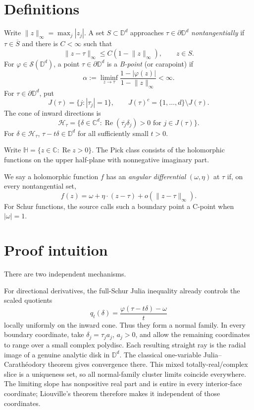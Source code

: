 \documentclass[11pt]{article}
\theoremstyle{definition}
\theoremstyle{remark}
\newcommand{\D}{\mathbb D}
\newcommand{\C}{\mathbb C}
\newcommand{\norm}[1]{\lVert #1\rVert_\infty}
\newcommand{\Schur}{\mathcal S}
\newcommand{\re}{\operatorname{Re}}
\begin{document}
\section{Definitions}

Write \(\norm{z}=\max_j|z_j|\).  A set \(S\subset\D^d\) approaches \(\tau\in\partial\D^d\) \emph{nontangentially} if \(\tau\in\overline S\) and there is \(C<\infty\) such that
\[
 \norm{z-\tau}\le C(1-\norm z),\qquad z\in S.
\]
For \(\varphi\in\Schur(\D^d)\), a point \(\tau\in\partial\D^d\) is a \emph{B-point} (or carapoint) if
\[
 \alpha:=\liminf_{z\to\tau}\frac{1-|\varphi(z)|}{1-\norm z}<\infty.
\]
For \(\tau\in\partial\D^d\), put
\[
 J(\tau)=\{j:|\tau_j|=1\},\qquad J(\tau)^c=\{1,\ldots,d\}\setminus J(\tau).
\]
The cone of inward directions is
\[
 \mathcal H_\tau
 =\{\delta\in\C^d:\re(\overline{\tau_j}\delta_j)>0\text{ for }j\in J(\tau)\}.
\]
For \(\delta\in\mathcal H_\tau\), \(\tau-t\delta\in\D^d\) for all sufficiently small \(t>0\).

Write \(\mathbb H=\{z\in\C:\re z>0\}\).  The Pick class consists of the holomorphic functions on the upper half-plane with nonnegative imaginary part.

We say a holomorphic function \(f\) has an \emph{angular differential} \((\omega,\eta)\) at \(\tau\) if, on every nontangential set,
\[
 f(z)=\omega+\eta\mathbin{\cdot}(z-\tau)+o(\norm{z-\tau}).
\]
For Schur functions, the source calls such a boundary point a C-point when \(|\omega|=1\).

\section{Proof intuition}

There are two independent mechanisms.

For directional derivatives, the full-Schur Julia inequality already controls the scaled quotients
\[
 q_t(\delta)=\frac{\varphi(\tau-t\delta)-\omega}{t}
\]
locally uniformly on the inward cone.  Thus they form a normal family.  In every boundary coordinate, take \(\delta_j=\tau_j a_j\), \(a_j>0\), and allow the remaining coordinates to range over a small complex polydisc.  Each resulting straight ray is the radial image of a genuine analytic disk in \(\D^d\).  The classical one-variable Julia--Carath\'eodory theorem gives convergence there.  This mixed totally-real/complex slice is a uniqueness set, so all normal-family cluster limits coincide everywhere.  The limiting slope has nonpositive real part and is entire in every interior-face coordinate; Liouville's theorem therefore makes it independent of those coordinates.
\end{document}
